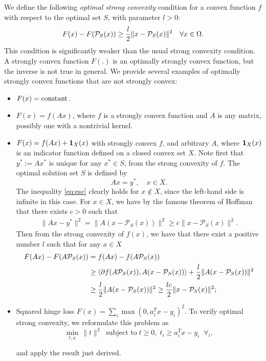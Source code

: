\documentclass{siamltex}
\begin{document}
We define the following {\em optimal strong convexity} condition for a
convex function $f$ with respect to the optimal set $S$, with
parameter $l>0$:
\begin{equation}
  F(x) - F({\mathcal{P}_{S}}(x)) \geq {l\over 2}\|x-{\mathcal{P}_{S}}(x)\|^2\quad \forall x\in \Omega.
  \label{eq:esc}
\end{equation}
This condition is significantly weaker than the usual strong
convexity condition. A strongly convex function $F(.)$ is an
optimally strongly convex function, but the inverse is not true in
general. We provide several examples of optimally strongly convex
functions that are not strongly convex:
\begin{itemize}
\item $F(x) = {\rm constant}$.
\item $F(x) = f(Ax)$, where $f$ is a strongly convex function and
  $A$ is any matrix, possibly one with a nontrivial kernel.
\item $F(x) = f(Ax) + {\bf 1}_{X}(x)$ with strongly convex $f$, and
  arbitrary $A$, where ${\bf 1}_X(x)$ is an indicator function
  defined on a closed convex set $X$. Note first that $y^*:=Ax^*$ is
  unique for any $x^*\in S$, from the strong convexity of $f$. The
  optimal solution set $S$ is defined by
  \[
  Ax = y^*,\quad x\in X.
  \]
  The inequality \eqref{eq:esc} clearly holds for $x \notin X$, since
  the left-hand side is infinite in this case. For $x \in X$, we have by
  the famous theorem of Hoffman \cite{Hoffman52} that there exists $c>0$ such that
  \begin{align*}
    \|Ax-y^*\|^2 = \|A(x-{\mathcal{P}_{S}}(x))\|^2 \geq c\|x-{\mathcal{P}_{S}}(x)\|^2.
  \end{align*}
  Then from the strong convexity of $f(x)$, we have that there exist a
  positive number $l$ such that for any $x\in X$
  \begin{align*}
    F(Ax)-F(A{\mathcal{P}_{S}}(x)) & =  f(Ax) - f(A{\mathcal{P}_{S}}(x)) 
    \\ 
    & \ge \langle \partial f(A{\mathcal{P}_{S}}(x)), A(x-{\mathcal{P}_{S}}(x)) \rangle + {l\over 2}\|A(x-{\mathcal{P}_{S}}(x))\|^2 
    \\ & \geq
       {l \over 2}\|A(x-{\mathcal{P}_{S}}(x))\|^2 \geq {lc \over 2}\|x-{\mathcal{P}_{S}}(x)\|^2;
  \end{align*}
\item Squared hinge loss $F(x) = \sum_{i} \max(0, a^T_i x -
  y_i)^2$. To verify optimal strong convexity, we reformulate this 
  problem as
  \[
  \min_{t,x} \, \|t\|^2 \;\; \mbox{subject to} \; t \ge 0, \; t_i \ge a_i^Tx-y_i \;\; \forall_i,
  \]
  
  
  
  
  
  and apply the result just derived.
  
  
\end{itemize}
\end{document}
